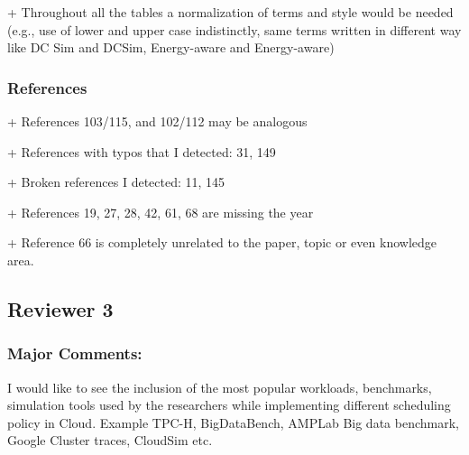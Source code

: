 + Throughout all the tables a normalization of terms and style would be needed (e.g., use of lower and upper case indistinctly, same terms written in different way like DC Sim and DCSim, Energy-aware and Energy-aware)




\subsubsection{References}

+ References 103/115, and 102/112 may be analogous


+ References with typos that I detected: 31, 149


+ Broken references I detected: 11, 145


+ References 19, 27, 28, 42, 61, 68 are missing the year



+ Reference 66 is completely unrelated to the paper, topic or even knowledge area.



\subsection{Reviewer 3}

\subsubsection{Major Comments:}

I would like to see the inclusion of the most popular workloads, benchmarks, simulation tools used by the researchers while implementing different scheduling policy in Cloud. Example TPC-H, BigDataBench, AMPLab Big data benchmark, Google Cluster traces, CloudSim etc.

